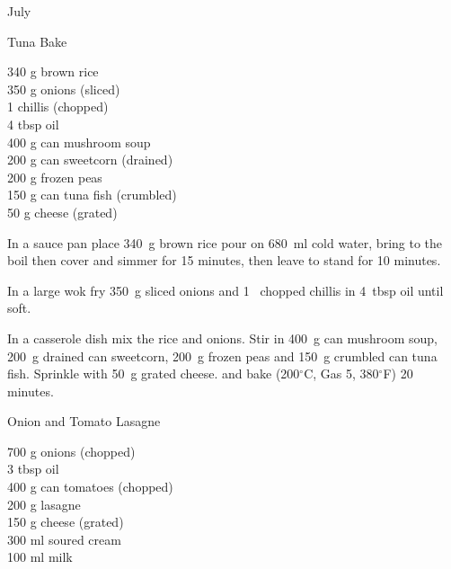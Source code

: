 \begin{menu}{July}
    \begin{recipe}{2}{Tuna Bake}%
		\begin{ingredients}
		340 g brown rice  \\
	350 g onions (sliced) \\
	1  chillis (chopped) \\
	4 tbsp oil  \\
	400 g can mushroom soup  \\
	200 g can sweetcorn (drained) \\
	200 g frozen peas  \\
	150 g can tuna fish (crumbled) \\
	50 g cheese (grated) \\
	
		\end{ingredients}
	
	
    \begin{instructions}
    \item 
    In a
    sauce pan
    place
    340~g  brown rice
    pour on
    680~ml  cold water,
    bring to the boil then cover and simmer for 15 minutes,
    then leave to stand for 10 minutes.
  \item 
        In a large wok fry
        350~g sliced onions
        and
        1~ chopped chillis
        in
        4~tbsp  oil
        until soft.
      \item 
        In a casserole dish mix
        the rice and onions.
        Stir in
        400~g  can mushroom soup,
        200~g drained can sweetcorn,
        200~g  frozen peas
        and
        150~g crumbled can tuna fish.
        Sprinkle with
        50~g grated cheese.
        and
        bake (200$^{\circ}$C, Gas 5, 380$^{\circ}$F) 20 minutes.
      
    \end{instructions}
    \end{recipe}%
  
    \begin{recipe}{2}{Onion and Tomato Lasagne}%
		\begin{ingredients}
		700 g onions (chopped) \\
	3 tbsp oil  \\
	400 g can tomatoes (chopped) \\
	200 g lasagne  \\
	150 g cheese (grated) \\
	300 ml soured cream  \\
	100 ml milk  \\
	

\end{ingredients}
\end{recipe}
\end{menu}
